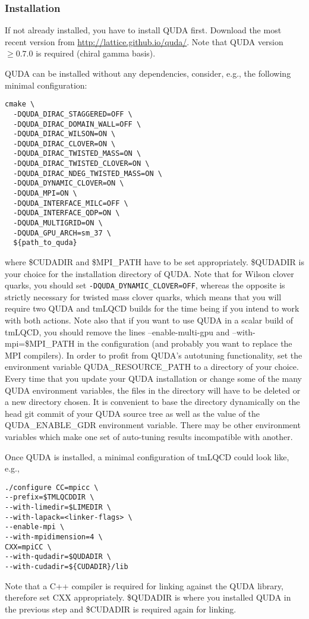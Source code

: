 \subsubsection{Installation}
If not already installed, you have to install QUDA first. Download the most recent version from \url{http://lattice.github.io/quda/}. Note that QUDA version $\geq 0.7.0$ is required (chiral gamma basis).

QUDA can be installed without any dependencies, consider, e.g., the following minimal configuration:

\begin{verbatim}
cmake \
  -DQUDA_DIRAC_STAGGERED=OFF \
  -DQUDA_DIRAC_DOMAIN_WALL=OFF \
  -DQUDA_DIRAC_WILSON=ON \
  -DQUDA_DIRAC_CLOVER=ON \
  -DQUDA_DIRAC_TWISTED_MASS=ON \
  -DQUDA_DIRAC_TWISTED_CLOVER=ON \
  -DQUDA_DIRAC_NDEG_TWISTED_MASS=ON \
  -DQUDA_DYNAMIC_CLOVER=ON \
  -DQUDA_MPI=ON \
  -DQUDA_INTERFACE_MILC=OFF \
  -DQUDA_INTERFACE_QDP=ON \ 
  -DQUDA_MULTIGRID=ON \
  -DQUDA_GPU_ARCH=sm_37 \
  ${path_to_quda}
\end{verbatim}
where {\ttfamily \$CUDADIR} and {\ttfamily \$MPI\_PATH} have to be set appropriately.
{\ttfamily \$QUDADIR} is your choice for the installation directory of QUDA.
Note that for Wilson clover quarks, you should set \texttt{-DQUDA\_DYNAMIC\_CLOVER=OFF}, whereas the opposite is strictly necessary for twisted mass clover quarks, which means that you will require two QUDA and tmLQCD builds for the time being if you intend to work with both actions.
Note also that if you want to use QUDA in a scalar build of tmLQCD, you should remove the lines {\ttfamily --enable-multi-gpu} and {\ttfamily --with-mpi=\$MPI\_PATH} in the configuration (and probably you want to replace the MPI compilers).
In order to profit from QUDA's autotuning functionality, set the environment variable {\ttfamily QUDA\_RESOURCE\_PATH} to a directory of your choice.
Every time that you update your QUDA installation or change some of the many QUDA environment variables, the files in the directory will have to be deleted or a new directory chosen.
It is convenient to base the directory dynamically on the head git commit of your QUDA source tree as well as the value of the {\ttfamily QUDA\_ENABLE\_GDR} environment variable.
There may be other environment variables which make one set of auto-tuning results incompatible with another.

Once QUDA is installed, a minimal configuration of tmLQCD could look like, e.g.,
\begin{verbatim}
./configure CC=mpicc \
--prefix=$TMLQCDDIR \
--with-limedir=$LIMEDIR \
--with-lapack=<linker-flags> \
--enable-mpi \
--with-mpidimension=4 \
CXX=mpiCC \
--with-qudadir=$QUDADIR \
--with-cudadir=${CUDADIR}/lib
\end{verbatim}
Note that a {\ttfamily C++} compiler is required for linking against the QUDA library, therefore set {\ttfamily CXX} appropriately. {\ttfamily \${QUDADIR}} is where you installed QUDA in the previous step and {\ttfamily \${CUDADIR}} is required again for linking.

